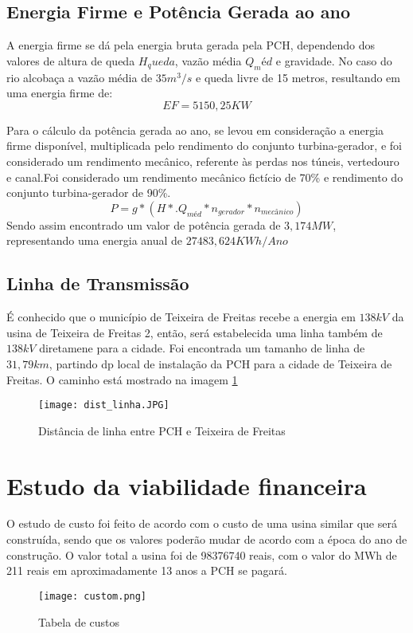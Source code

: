 \section{Energia Firme e Potência Gerada ao ano}
A energia firme se dá pela energia bruta gerada pela PCH, dependendo dos valores de altura de queda $H_queda$, vazão média $Q_méd$ e gravidade. No caso do rio alcobaça a vazão média de $35 m^3/s$ e queda livre de 15 metros, resultando em uma energia firme de:
\begin{equation}
	EF = 5150,25 KW
\end{equation}

Para o cálculo da potência gerada ao ano, se levou em consideração a energia firme disponível, multiplicada pelo rendimento do conjunto turbina-gerador, e foi considerado um rendimento mecânico, referente às perdas nos túneis, vertedouro e canal.Foi considerado um rendimento mecânico fictício de 70\% e rendimento do conjunto turbina-gerador de 90\%.
\begin{equation}
P = g *(H*. Q_{méd} * n_{gerador} *n_{mecânico})
\end{equation}
Sendo assim encontrado um valor de potência gerada de $3,174MW$, representando uma energia anual de $27483,624 KWh/Ano$

\section{Linha de Transmissão}
É conhecido que o município de Teixeira de Freitas recebe a energia em $138kV$ da usina de Teixeira de Freitas 2, então, será estabelecida uma linha também de $138kV$ diretamene para a cidade. Foi encontrada um tamanho de linha de $31,79km$, partindo dp local de instalação da PCH para a cidade de Teixeira de Freitas. O caminho está mostrado na imagem \ref{fig:dist}
\begin{figure}[h]
	\centering
	\texttt{[image: dist\_linha.JPG]}
	\caption{Distância de linha entre PCH e Teixeira de Freitas}
	\label{fig:dist}
\end{figure}

\chapter{Estudo da viabilidade financeira}
O estudo de custo foi feito de acordo com o custo de uma usina similar que será construída, sendo que os valores poderão mudar de acordo com a época do ano de construção. O valor total a usina foi de 98376740 reais, com o valor do MWh de 211 reais em aproximadamente 13 anos a PCH se pagará.
\begin{figure}[h]
	\centering
	\texttt{[image: custom.png]}
	\caption{Tabela de custos}
	\label{fig:custo}
\end{figure}

